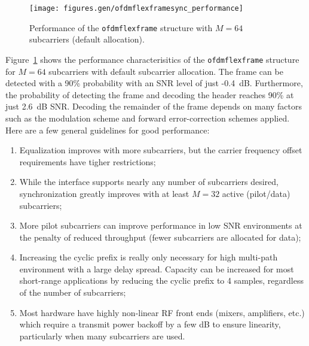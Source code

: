 % 
%
\begin{figure}
\centering
  \texttt{[image: figures.gen/ofdmflexframesync\_performance]}
\caption{Performance of the {\tt ofdmflexframe} structure with
         $M=64$ subcarriers (default allocation).}
\label{fig:module:framing:ofdmflexframe_performance}
\end{figure}
%
Figure~\ref{fig:module:framing:ofdmflexframe_performance} shows the
performance characterisitics of the {\tt ofdmflexframe} structure for
$M=64$ subcarriers with default subcarrier allocation.
The frame can be detected with a 90\% probability with an SNR level of
just -0.4~dB.
Furthermore, the probability of detecting the frame and decoding the
header reaches 90\% at just 2.6~dB SNR.
Decoding the remainder of the frame depends on many factors such as the
modulation scheme and forward error-correction schemes applied.
%
Here are a few general guidelines for good performance:
\begin{enumerate}
\item Equalization improves with more subcarriers, but the carrier
      frequency offset requirements have tigher restrictions;
\item While the interface supports nearly any number of subcarriers
      desired, synchronization greatly improves with at least $M=32$
      active (pilot/data) subcarriers;
\item More pilot subcarriers can improve performance in low SNR 
      environments at the penalty of reduced throughput
      (fewer subcarriers are allocated for data);
\item Increasing the cyclic prefix is really only necessary for high
      multi-path environment with a large delay spread.
      Capacity can be increased for most short-range applications by
      reducing the cyclic prefix to 4 samples, regardless of the number
      of subcarriers;
\item Most hardware have highly non-linear RF front ends (mixers,
      amplifiers, etc.) which require a transmit power backoff by a few
      dB to ensure linearity, particularly when many subcarriers are
      used.
\end{enumerate}
%
